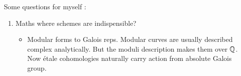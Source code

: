 \documentclass[./main.tex]{subfiles}
\begin{document}
Some questions for myself : 
\begin{enumerate}
  \item Maths where schemes are indispensible?
  \begin{itemize}
    \item Modular forms to Galois reps.
    Modular curves are usually described complex analytically.
    But the moduli description makes them over $\mathbb{Q}$.
    Now étale cohomologies naturally carry action from absolute Galois group.
  \end{itemize}
\end{enumerate}
\end{document}
